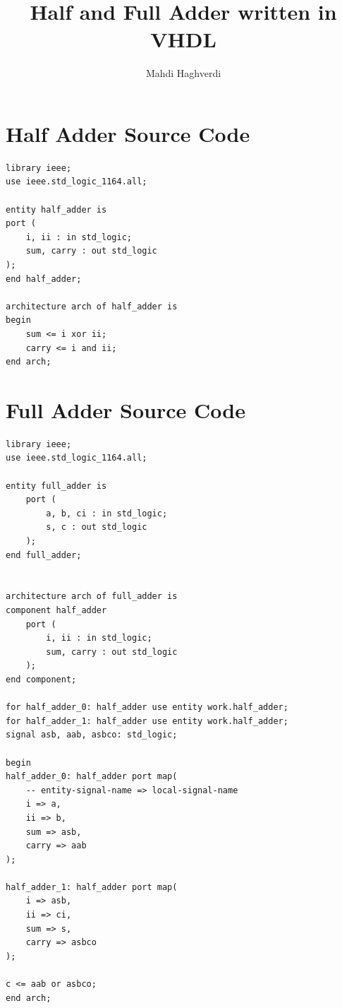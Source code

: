 \documentclass[dvipsnames, svgnames, x11names, a4paper, 11pt,]{article}
\title{Half and Full Adder written in VHDL}
\author{Mahdi Haghverdi}
\begin{document}
    \maketitle
    \tableofcontents
    
\section{Half Adder Source Code}
\begin{lstlisting}
library ieee;
use ieee.std_logic_1164.all;

entity half_adder is
port (
    i, ii : in std_logic;
    sum, carry : out std_logic
);
end half_adder;

architecture arch of half_adder is
begin
    sum <= i xor ii;
    carry <= i and ii;
end arch;
\end{lstlisting}

\newpage
\section{Full Adder Source Code}
\begin{lstlisting}
library ieee;
use ieee.std_logic_1164.all;

entity full_adder is
    port (
        a, b, ci : in std_logic;
        s, c : out std_logic
    );
end full_adder;


architecture arch of full_adder is
component half_adder
    port (
        i, ii : in std_logic;
        sum, carry : out std_logic
    );
end component;

for half_adder_0: half_adder use entity work.half_adder;
for half_adder_1: half_adder use entity work.half_adder;
signal asb, aab, asbco: std_logic;

begin
half_adder_0: half_adder port map(
    -- entity-signal-name => local-signal-name
    i => a,
    ii => b,
    sum => asb,
    carry => aab
);

half_adder_1: half_adder port map(
    i => asb,
    ii => ci,
    sum => s,
    carry => asbco
);

c <= aab or asbco;
end arch;
\end{lstlisting}

\newpage
\end{document}
